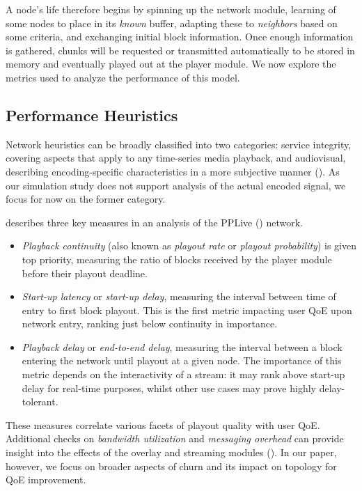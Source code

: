 \documentclass[12pt,a4paper]{article}
\begin{document}
A node's life therefore begins by spinning up the network module, learning of some nodes to place in its \textit{known} buffer, adapting these to \textit{neighbors} based on some criteria, and exchanging initial block information. Once enough information is gathered, chunks will be requested or transmitted automatically to be stored in memory and eventually played out at the player module. We now explore the metrics used to analyze the performance of this model.

\subsection{Performance Heuristics} \label{litreview:heuristics}
Network heuristics can be broadly classified into two categories: service integrity, covering aspects that apply to any time-series media playback, and audiovisual, describing encoding-specific characteristics in a more subjective manner (\cite{Moltchanov2011}). As our simulation study does not support analysis of the actual encoded signal, we focus for now on the former category.

\cite{Hei2007} describes three key measures in an analysis of the PPLive (\cite{PPLive}) network.
\begin{itemize}
	\item \textit{Playback continuity} (also known as \textit{playout rate} or \textit{playout probability}) is given top priority, measuring the ratio of blocks received by the player module before their playout deadline. 
	\item \textit{Start-up latency} or \textit{start-up delay}, measuring the interval between time of entry to first block playout. This is the first metric impacting user QoE upon network entry, ranking just below continuity in importance.
	\item \textit{Playback delay} or \textit{end-to-end delay}, measuring the interval between a block entering the network until playout at a given node. The importance of this metric depends on the interactivity of a stream: it may rank above start-up delay for real-time purposes, whilst other use cases may prove highly delay-tolerant.
\end{itemize}

These measures correlate various facets of playout quality with user QoE. Additional checks on \textit{bandwidth utilization} and \textit{messaging overhead} can provide insight into the effects of the overlay and streaming modules (\cite{Carta2010}). In our paper, however, we focus on broader aspects of churn and its impact on topology for QoE improvement.
\end{document}
